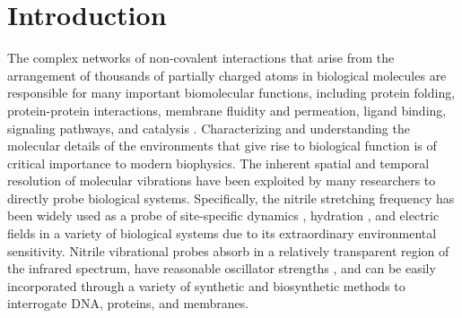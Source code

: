 \section{Introduction}

The complex networks of non-covalent interactions that arise from the arrangement of thousands of partially charged atoms in biological molecules are responsible for many important biomolecular functions, including protein folding, protein-protein interactions, membrane fluidity and permeation, ligand binding, signaling pathways, and catalysis \cite{Honig1995}.
Characterizing and understanding the molecular details of the environments that give rise to biological function is of critical importance to modern biophysics.
The inherent spatial and temporal resolution of molecular vibrations have been exploited by many researchers to directly probe biological systems.
Specifically, the nitrile stretching frequency has been widely used as a probe of site-specific dynamics \cite{Fang2008, Sigala2007, Yoshikawa1985}, hydration \cite{Waegele2009, Oh2008}, and electric fields\cite{Webb2008, Slocum2016, Shrestha2015, Shrestha2017, Andrews2000, Andrews2002} in a variety of biological systems due to its extraordinary environmental sensitivity.
Nitrile vibrational probes absorb in a relatively transparent region of the infrared spectrum, have reasonable oscillator strengths \cite{Webb2008}, and can be easily incorporated through a variety of synthetic and biosynthetic methods\cite{Fafarman2006, Getahun2003, Kirshenbaum2002} to interrogate DNA, proteins, and membranes. 


